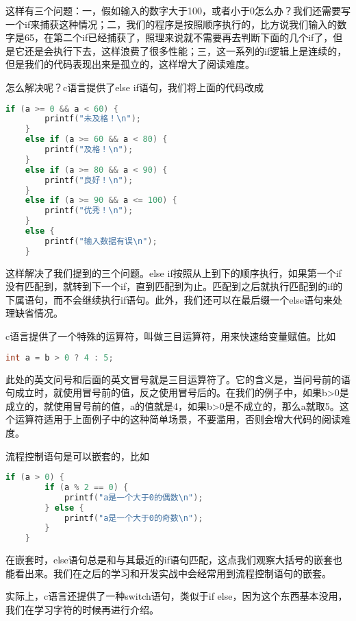 这样有三个问题：一，假如输入的数字大于100，或者小于0怎么办？我们还需要写一个if来捕获这种情况；二，我们的程序是按照顺序执行的，比方说我们输入的数字是65，在第二个if已经捕获了，照理来说就不需要再去判断下面的几个if了，但是它还是会执行下去，这样浪费了很多性能；三，这一系列的if逻辑上是连续的，但是我们的代码表现出来是孤立的，这样增大了阅读难度。

怎么解决呢？c语言提供了else if语句，我们将上面的代码改成

\begin{lstlisting}[language=C]
    if (a >= 0 && a < 60) {
        printf("未及格！\n");
    }
    else if (a >= 60 && a < 80) {
        printf("及格！\n");
    }
    else if (a >= 80 && a < 90) {
        printf("良好！\n");
    }
    else if (a >= 90 && a <= 100) {
        printf("优秀！\n");
    }
    else {
        printf("输入数据有误\n");
    }
\end{lstlisting}

这样解决了我们提到的三个问题。else if按照从上到下的顺序执行，如果第一个if没有匹配到，就转到下一个if，直到匹配到为止。匹配到之后就执行匹配到的if的下属语句，而不会继续执行if语句。此外，我们还可以在最后缀一个else语句来处理缺省情况。

c语言提供了一个特殊的运算符，叫做三目运算符，用来快速给变量赋值。比如

\begin{lstlisting}[language=C]
    int a = b > 0 ? 4 : 5;
\end{lstlisting}

此处的英文问号和后面的英文冒号就是三目运算符了。它的含义是，当问号前的语句成立时，就使用冒号前的值，反之使用冒号后的。在我们的例子中，如果b>0是成立的，就使用冒号前的值，a的值就是4，如果b>0是不成立的，那么a就取5。这个运算符适用于上面例子中的这种简单场景，不要滥用，否则会增大代码的阅读难度。

流程控制语句是可以嵌套的，比如

\begin{lstlisting}[language=C]
    if (a > 0) {
        if (a % 2 == 0) {
            printf("a是一个大于0的偶数\n");
        } else {
            printf("a是一个大于0的奇数\n");
        }
    }
\end{lstlisting}

在嵌套时，else语句总是和与其最近的if语句匹配，这点我们观察大括号的嵌套也能看出来。我们在之后的学习和开发实战中会经常用到流程控制语句的嵌套。

实际上，c语言还提供了一种switch语句，类似于if else，因为这个东西基本没用，我们在学习字符的时候再进行介绍。


